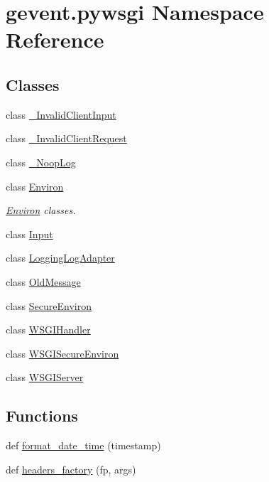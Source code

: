 \hypertarget{namespacegevent_1_1pywsgi}{}\section{gevent.\+pywsgi Namespace Reference}
\label{namespacegevent_1_1pywsgi}
\subsection*{Classes}
\begin{DoxyCompactItemize}
\item 
class \hyperlink{classgevent_1_1pywsgi_1_1___invalid_client_input}{\+\_\+\+Invalid\+Client\+Input}
\item 
class \hyperlink{classgevent_1_1pywsgi_1_1___invalid_client_request}{\+\_\+\+Invalid\+Client\+Request}
\item 
class \hyperlink{classgevent_1_1pywsgi_1_1___noop_log}{\+\_\+\+Noop\+Log}
\item 
class \hyperlink{classgevent_1_1pywsgi_1_1_environ}{Environ}
\begin{DoxyCompactList}\small\item\em \hyperlink{classgevent_1_1pywsgi_1_1_environ}{Environ} classes. \end{DoxyCompactList}\item 
class \hyperlink{classgevent_1_1pywsgi_1_1_input}{Input}
\item 
class \hyperlink{classgevent_1_1pywsgi_1_1_logging_log_adapter}{Logging\+Log\+Adapter}
\item 
class \hyperlink{classgevent_1_1pywsgi_1_1_old_message}{Old\+Message}
\item 
class \hyperlink{classgevent_1_1pywsgi_1_1_secure_environ}{Secure\+Environ}
\item 
class \hyperlink{classgevent_1_1pywsgi_1_1_w_s_g_i_handler}{W\+S\+G\+I\+Handler}
\item 
class \hyperlink{classgevent_1_1pywsgi_1_1_w_s_g_i_secure_environ}{W\+S\+G\+I\+Secure\+Environ}
\item 
class \hyperlink{classgevent_1_1pywsgi_1_1_w_s_g_i_server}{W\+S\+G\+I\+Server}
\end{DoxyCompactItemize}
\subsection*{Functions}
\begin{DoxyCompactItemize}
\item 
def \hyperlink{namespacegevent_1_1pywsgi_a3eed08f5efcf9b013a5a8db9270c954d}{format\+\_\+date\+\_\+time} (timestamp)
\item 
def \hyperlink{namespacegevent_1_1pywsgi_a82daeec2a9f485ab21656054c259cf75}{headers\+\_\+factory} (fp, args)
\end{DoxyCompactItemize}
